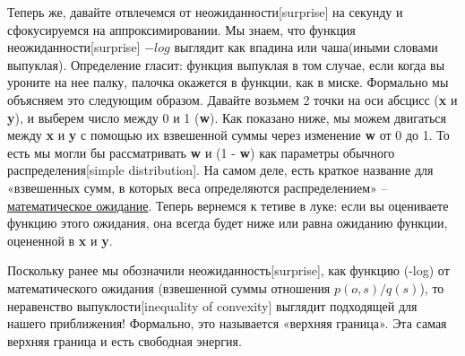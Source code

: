 \documentclass[twoside,leqno, 11pt]{article}
\begin{document}
	Теперь же, давайте отвлечемся от неожиданности[surprise] на секунду и сфокусируемся на аппроксимировании. Мы знаем, что функция неожиданности[surprise] $-log$ выглядит как впадина или чаша(иными словами выпуклая). Определение гласит: функция выпуклая в том случае, если когда вы уроните на нее палку, палочка окажется в функции, как в миске. Формально мы объясняем это следующим образом. Давайте возьмем 2 точки на оси абсцисс (\textbf{x} и \textbf{y}), и выберем число между 0 и 1 (\textbf{w}). Как показано ниже, мы можем двигаться между \textbf{x} и \textbf{y} с помощью их взвешенной суммы через изменение \textbf{w} от 0 до 1. То есть мы могли бы рассматривать \textbf{w} и (1 - \textbf{w}) как параметры обычного распределения[simple distribution]. На самом деле, есть краткое название для «взвешенных сумм, в которых веса определяются распределением» -- \href{https://en.wikipedia.org/wiki/Expected_value}{математическое ожидание}. Теперь вернемся к тетиве в луке: если вы оцениваете функцию этого ожидания, она всегда будет ниже или равна ожиданию функции, оцененной в \textbf{x} и \textbf{y}.
	
	\begin{figure}[h]
		\label{ris:image}
	\end{figure}
	
	Поскольку ранее мы обозначили неожиданность[surprise], как функцию (-log) от математического ожидания (взвешенной суммы отношения $p(o, s) / q(s)$), то неравенство выпуклости[inequality of convexity] выглядит подходящей для нашего приближения! Формально, это называется «верхняя граница». Эта самая верхняя граница и есть свободная энергия.
	
	\begin{figure}[h]
		\label{ris:image}
	\end{figure}
	
\end{document}
